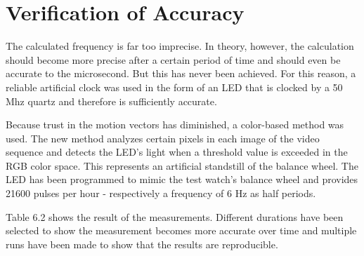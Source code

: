 \documentclass[12pt, a4paper]{report}
\begin{document}
    \section{Verification of Accuracy}
    The calculated frequency is far too imprecise. In theory, however, the calculation should become more precise after a certain period of time and should even be accurate to the microsecond.
    But this has never been achieved. For this reason, a reliable artificial clock was used in the form of an LED that is clocked by a 50 Mhz quartz and therefore is sufficiently accurate.
    
    Because trust in the motion vectors has diminished, a color-based method was used. The new method analyzes certain pixels in each image of the video sequence and detects the LED's light when a threshold value is exceeded in the RGB color space. This represents an artificial standstill of the balance wheel.
    The LED has been programmed to mimic the test watch's balance wheel and provides 21600 pulses per hour -
    respectively a frequency of 6 Hz as half periods.

    Table 6.2 shows the result of the measurements. Different durations have been selected to show the measurement becomes more accurate over time and multiple runs have been made to show that the results are reproducible.
   
\end{document}
